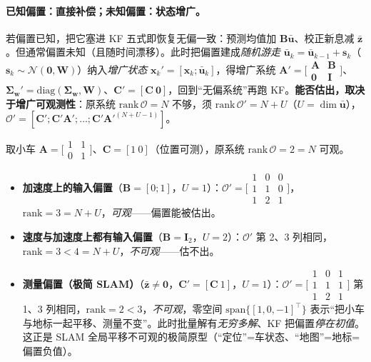 \paragraph{已知偏置：直接补偿；未知偏置：状态增广。}
若偏置已知，把它塞进 KF 五式即恢复无偏一致：预测均值加 $\mathbf{B}\bar{\mathbf{u}}$、校正新息减 $\bar{\mathbf{z}}$。但通常偏置未知（且随时间漂移）。此时把偏置建成\emph{随机游走} $\bar{\mathbf{u}}_k=\bar{\mathbf{u}}_{k-1}+\mathbf{s}_k$（$\mathbf{s}_k\sim\mathcal{N}(\mathbf{0},\mathbf{W})$）纳入\emph{增广状态} $\mathbf{x}_k'=[\mathbf{x}_k;\bar{\mathbf{u}}_k]$，得增广系统 $\mathbf{A}'=\big[\begin{smallmatrix}\mathbf{A}&\mathbf{B}\\\mathbf{0}&\mathbf{I}\end{smallmatrix}\big]$、$\boldsymbol{\Sigma}_{\mathbf{w}}'=\mathrm{diag}(\boldsymbol{\Sigma}_{\mathbf{w}},\mathbf{W})$、$\mathbf{C}'=[\mathbf{C}\ \mathbf{0}]$，回到“无偏系统”再跑 KF。\textbf{能否估出，取决于增广可观测性}：原系统 $\mathrm{rank}\,\mathcal{O}=N$ 不够，须 $\mathrm{rank}\,\mathcal{O}'=N+U$（$U=\dim\bar{\mathbf{u}}$），$\mathcal{O}'=[\mathbf{C}';\mathbf{C}'\mathbf{A}';\dots;\mathbf{C}'\mathbf{A}'^{(N+U-1)}]$。

\begin{example}\label{ex:bias-obs}
取小车 $\mathbf{A}=\big[\begin{smallmatrix}1&1\\0&1\end{smallmatrix}\big]$、$\mathbf{C}=[1\ 0]$（位置可测），原系统 $\mathrm{rank}\,\mathcal{O}=2=N$ 可观\cite{barfoot2024state}。
\begin{itemize}
  \item \textbf{加速度上的输入偏置}（$\mathbf{B}=[0;1]$，$U=1$）：$\mathcal{O}'=\big[\begin{smallmatrix}1&0&0\\1&1&0\\1&2&1\end{smallmatrix}\big]$，$\mathrm{rank}=3=N+U$，\emph{可观}——偏置能被估出。
  \item \textbf{速度与加速度上都有输入偏置}（$\mathbf{B}=\mathbf{I}_2$，$U=2$）：$\mathcal{O}'$ 第 2、3 列相同，$\mathrm{rank}=3<4=N+U$，\emph{不可观}——估不出。
  \item \textbf{测量偏置（极简 SLAM）}（$\bar{\mathbf{z}}\ne\mathbf{0}$，$\mathbf{C}'=[\mathbf{C}\ 1]$，$U=1$）：$\mathcal{O}'=\big[\begin{smallmatrix}1&0&1\\1&1&1\\1&2&1\end{smallmatrix}\big]$ 第 1、3 列相同，$\mathrm{rank}=2<3$，\emph{不可观}，零空间 $\mathrm{span}\{[1,0,-1]^\top\}$ 表示“把小车与地标一起平移、测量不变”。此时批量解有\emph{无穷多解}、KF 把偏置\emph{停在初值}。这正是 SLAM 全局平移不可观的极简原型（“定位”=车状态、“地图”=地标=偏置负值）。
\end{itemize}
\end{example}

